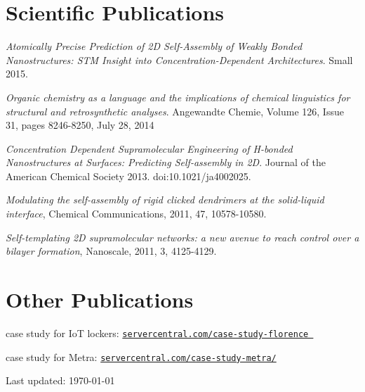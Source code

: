 \documentclass[11pt,letterpaper]{article}
\def\footerlink{}
\renewenvironment{itemize}{
  \begin{list}{}{
    \setlength{\leftmargin}{1.5em}
  }
}{
  \end{list}
}
\begin{document}
\section*{Scientific Publications}
\begin {itemize}
\item       \textit{Atomically Precise Prediction of 2D Self-Assembly of Weakly Bonded Nanostructures: STM Insight into Concentration-Dependent Architectures}. Small 2015.
\item       \textit{Organic chemistry as a language and the implications of chemical linguistics for structural and retrosynthetic analyses}. Angewandte Chemie, Volume 126, Issue 31, pages 8246-8250, July 28, 2014
\item 	    \textit{Concentration Dependent Supramolecular Engineering of H-bonded Nanostructures at Surfaces: Predicting Self-assembly in 2D}. Journal of the American Chemical Society 2013. doi:10.1021/ja4002025.
\item  \textit{Modulating the self-assembly of rigid clicked dendrimers at the solid-liquid interface}, Chemical Communications, 2011, 47, 10578-10580.
\item  \textit{
Self-templating 2D supramolecular networks: a new avenue to reach control over a bilayer formation}, Nanoscale, 2011, 3, 4125-4129.
\end{itemize}

\section* {Other Publications}
\begin {itemize}
\item case study for IoT lockers: \href{https://www.servercentral.com/case-study-florence/}{\tt {servercentral.com/case-study-florence }}
\item case study for Metra: \href{https://www.servercentral.com/case-study-metra/}{\tt {servercentral.com/case-study-metra/}}
\end {itemize}



\begin{center}
  \begin{footnotesize}
    Last updated: \today \\
    \href{\footerlink}{\texttt{\footerlink}}
  \end{footnotesize}
\end{center}
\end{document}
